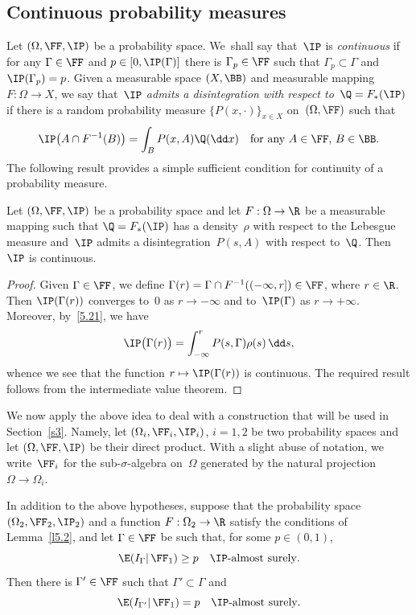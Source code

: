 \subsection{Continuous probability measures}
\label{s5.2}
Let $(\Omega,\FF,\IP)$ be a probability space. We~shall say that~$\IP$ is \emph{continuous} if for any $\Gamma\in\FF$ and $p\in[0,\IP(\Gamma)]$ there is $\Gamma_p\in\FF$ such that $\Gamma_p\subset\Gamma$ and $\IP(\Gamma_p)=p$. Given a measurable space $(X,\BB)$ and measurable mapping $F:\Omega\to X$, we say that~\emph{$\IP$ admits a disintegration with respect to~$\Q=F_*(\IP)$} if there is a random probability measure $\{P(x,\cdot)\}_{x\in X}$ on~$(\Omega,\FF)$ such that
\begin{equation} \label{5.21}
\IP\bigl(A\cap F^{-1}(B)\bigr)=\int_B P(x,A)\Q(\dd x)\quad
\text{for any $A\in\FF$, $B\in\BB$}.
\end{equation}
The following result provides a simple sufficient condition for continuity of a probability measure.

\begin{lemma} \label{l5.2}
Let $(\Omega,\FF,\IP)$ be a probability space and let $F:\Omega\to\R$ be a measurable mapping such that $\Q=F_*(\IP)$ has a density~$\rho$ with respect to the Lebesgue measure and~$\IP$ admits a disintegration~$P(s,A)$ with respect to~$\Q$. Then~$\IP$ is continuous.
\end{lemma}

\begin{proof}
Given $\Gamma\in\FF$, we define $\Gamma(r)=\Gamma\cap F^{-1}((-\infty,r])\in\FF$, where $r\in\R$. Then $\IP(\Gamma(r))$ converges to~$0$ as $r\to-\infty$ and to~$\IP(\Gamma)$ as $r\to+\infty$. Moreover, by~\eqref{5.21}, we have
\[
\IP\bigl(\Gamma(r)\bigr)=\int_{-\infty}^r P(s,\Gamma)\rho(s)\,\dd s,
\]
whence we see that the function $r\mapsto \IP(\Gamma(r))$ is continuous. The required result follows from the intermediate value theorem.
\end{proof}

We now apply the above idea to deal with a construction that will be used in Section~\ref{s3}. Namely, let $(\Omega_i,\FF_i,\IP_i)$, $i=1,2$ be two probability spaces and let $(\Omega,\FF,\IP)$ be their direct product. With a slight abuse of notation, we write~$\FF_i$ for the sub-$\sigma$-algebra on~$\Omega$ generated by the natural projection $\Omega\to\Omega_i$.

\begin{lemma} \label{l5.3}
In addition to the above hypotheses, suppose that the probability space $(\Omega_2,\FF_2,\IP_2)$ and a function $F:\Omega_2\to\R$ satisfy the conditions of Lemma~\ref{l5.2}, and let $\Gamma\in\FF$ be such that, for some $p\in(0,1)$,
\begin{equation} \label{5.22}
\E(I_\Gamma|\,\FF_1)\ge p\quad\text{$\IP$-almost surely}.
\end{equation}
Then there is $\Gamma'\in\FF$ such that $\Gamma'\subset\Gamma$ and
\begin{equation} \label{5.23}
\E(I_{\Gamma'}|\,\FF_1)= p\quad\text{$\IP$-almost surely}.
\end{equation}
\end{lemma}

